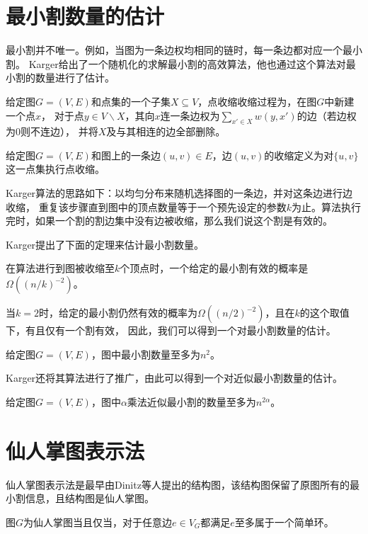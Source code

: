 \section{最小割数量的估计}

最小割并不唯一。例如，当图为一条边权均相同的链时，每一条边都对应一个最小割。
Karger给出了一个随机化的求解最小割的高效算法，他也通过这个算法对最小割的数量进行了估计。

\begin{definition}
    给定图$G=(V,E)$和点集的一个子集$X\subseteq V$，点收缩收缩过程为，在图$G$中新建一个点$x$，
    对于点$y\in V\backslash X$，其向$x$连一条边权为$\sum_{x'\in X}w(y,x')$的边（若边权为$0$则不连边），
    并将$X$及与其相连的边全部删除。
\end{definition}

\begin{definition}
    给定图$G=(V,E)$和图上的一条边$(u,v)\in E$，边$(u,v)$的收缩定义为对$\{u,v\}$这一点集执行点收缩。
\end{definition}

Karger算法的思路如下：以均匀分布来随机选择图的一条边，并对这条边进行边收缩，
重复该步骤直到图中的顶点数量等于一个预先设定的参数$k$为止。算法执行完时，如果一个割的割边集中没有边被收缩，那么我们说这个割是有效的。

Karger提出了下面的定理来估计最小割数量。
\begin{theorem}\cite{karger1993global}
    在算法进行到图被收缩至$k$个顶点时，一个给定的最小割有效的概率是$\Omega((n/k)^{-2})$。
\end{theorem}
当$k=2$时，给定的最小割仍然有效的概率为$\Omega((n/2)^{-2})$，且在$k$的这个取值下，有且仅有一个割有效，
因此，我们可以得到一个对最小割数量的估计。
\begin{theorem}
    给定图$G=(V,E)$，图中最小割数量至多为$n^2$。
\end{theorem}
Karger还将其算法进行了推广，由此可以得到一个对近似最小割数量的估计。
\begin{theorem}\cite{karger1994random}
    给定图$G=(V,E)$，图中$\alpha$乘法近似最小割的数量至多为$n^{2\alpha}$。
\end{theorem}

\section{仙人掌图表示法}

仙人掌图表示法是最早由Dinitz等人提出的结构图，该结构图保留了原图所有的最小割信息，且结构图是仙人掌图。

\begin{definition}
    图$G$为仙人掌图当且仅当，对于任意边$e\in V_G$都满足$e$至多属于一个简单环。
\end{definition}

